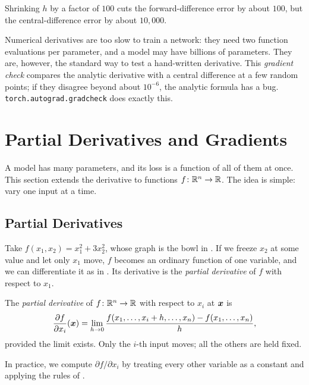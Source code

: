 Shrinking $h$ by a factor of $100$ cuts the forward-difference error by
about $100$, but the central-difference error by about $10{,}000$.

\begin{aibox}
  Numerical derivatives are too slow to train a network: they need two
  function evaluations per parameter, and a model may have billions of
  parameters. They are, however, the standard way to test a hand-written
  derivative. This \emph{gradient check} compares the analytic derivative
  with a central difference at a few random points; if they disagree
  beyond about $10^{-6}$, the analytic formula has a bug.
  \texttt{torch.autograd.gradcheck} does exactly this.
\end{aibox}

\section{Partial Derivatives and Gradients}
\label{sec:ch02-gradients}

A model has many parameters, and its loss is a function of all of them at
once. This section extends the derivative to functions
$f\colon \mathbb{R}^n \to \mathbb{R}$. The idea is simple: vary one input at a time.

\subsection{Partial Derivatives}
\label{sec:ch02-partial}

Take $f(x_1, x_2) = x_1^2 + 3x_2^2$, whose graph is the bowl in
. If we freeze $x_2$ at some value and let only $x_1$
move, $f$ becomes an ordinary function of one variable, and we can
differentiate it as in . Its derivative is the
\emph{partial derivative} of $f$ with respect to $x_1$.

\begin{definition}
  \label{def:partial}
  The \emph{partial derivative} of $f\colon \mathbb{R}^n \to \mathbb{R}$ with respect to
  $x_i$ at $\bm{x}$ is
  \[
    \frac{\partial f}{\partial x_i}(\bm{x})
    = \lim_{h \to 0}
      \frac{f(x_1, \dots, x_i + h, \dots, x_n) - f(x_1, \dots, x_n)}{h},
  \]
  provided the limit exists. Only the $i$-th input moves; all the others
  are held fixed.
\end{definition}

In practice, we compute $\partial f / \partial x_i$ by treating every other
variable as a constant and applying the rules of .

